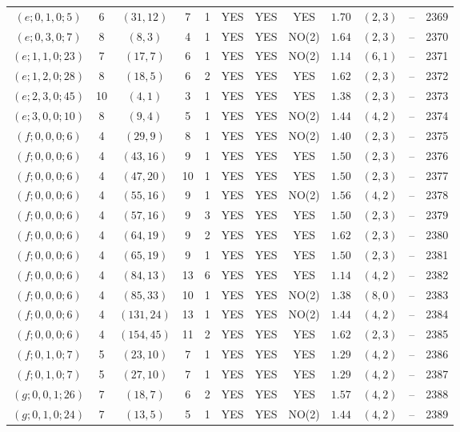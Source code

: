 \begin{longtable}{|c|c|c|c|c|c|c|c|c|c|c|c|}
$(e;0,1,0;5)$ & 6 & $(31,12)$ & 7 & 1 & YES & YES & YES & $1.70$ & $(2,3)$ & -- & 2369\\
$(e;0,3,0;7)$ & 8 & $(8,3)$ & 4 & 1 & YES & YES & NO(2) & $1.64$ & $(2,3)$ & -- & 2370\\
$(e;1,1,0;23)$ & 7 & $(17,7)$ & 6 & 1 & YES & YES & NO(2) & $1.14$ & $(6,1)$ & -- & 2371\\
$(e;1,2,0;28)$ & 8 & $(18,5)$ & 6 & 2 & YES & YES & YES & $1.62$ & $(2,3)$ & -- & 2372\\
$(e;2,3,0;45)$ & 10 & $(4,1)$ & 3 & 1 & YES & YES & YES & $1.38$ & $(2,3)$ & -- & 2373\\
$(e;3,0,0;10)$ & 8 & $(9,4)$ & 5 & 1 & YES & YES & NO(2) & $1.44$ & $(4,2)$ & -- & 2374\\
$(f;0,0,0;6)$ & 4 & $(29,9)$ & 8 & 1 & YES & YES & NO(2) & $1.40$ & $(2,3)$ & -- & 2375\\
$(f;0,0,0;6)$ & 4 & $(43,16)$ & 9 & 1 & YES & YES & YES & $1.50$ & $(2,3)$ & -- & 2376\\
$(f;0,0,0;6)$ & 4 & $(47,20)$ & 10 & 1 & YES & YES & YES & $1.50$ & $(2,3)$ & -- & 2377\\
$(f;0,0,0;6)$ & 4 & $(55,16)$ & 9 & 1 & YES & YES & NO(2) & $1.56$ & $(4,2)$ & -- & 2378\\
$(f;0,0,0;6)$ & 4 & $(57,16)$ & 9 & 3 & YES & YES & YES & $1.50$ & $(2,3)$ & -- & 2379\\
$(f;0,0,0;6)$ & 4 & $(64,19)$ & 9 & 2 & YES & YES & YES & $1.62$ & $(2,3)$ & -- & 2380\\
$(f;0,0,0;6)$ & 4 & $(65,19)$ & 9 & 1 & YES & YES & YES & $1.50$ & $(2,3)$ & -- & 2381\\
$(f;0,0,0;6)$ & 4 & $(84,13)$ & 13 & 6 & YES & YES & YES & $1.14$ & $(4,2)$ & -- & 2382\\
$(f;0,0,0;6)$ & 4 & $(85,33)$ & 10 & 1 & YES & YES & NO(2) & $1.38$ & $(8,0)$ & -- & 2383\\
$(f;0,0,0;6)$ & 4 & $(131,24)$ & 13 & 1 & YES & YES & NO(2) & $1.44$ & $(4,2)$ & -- & 2384\\
$(f;0,0,0;6)$ & 4 & $(154,45)$ & 11 & 2 & YES & YES & YES & $1.62$ & $(2,3)$ & -- & 2385\\
$(f;0,1,0;7)$ & 5 & $(23,10)$ & 7 & 1 & YES & YES & YES & $1.29$ & $(4,2)$ & -- & 2386\\
$(f;0,1,0;7)$ & 5 & $(27,10)$ & 7 & 1 & YES & YES & YES & $1.29$ & $(4,2)$ & -- & 2387\\
$(g;0,0,1;26)$ & 7 & $(18,7)$ & 6 & 2 & YES & YES & YES & $1.57$ & $(4,2)$ & -- & 2388\\
$(g;0,1,0;24)$ & 7 & $(13,5)$ & 5 & 1 & YES & YES & NO(2) & $1.44$ & $(4,2)$ & -- & 2389\\

\end{longtable}
